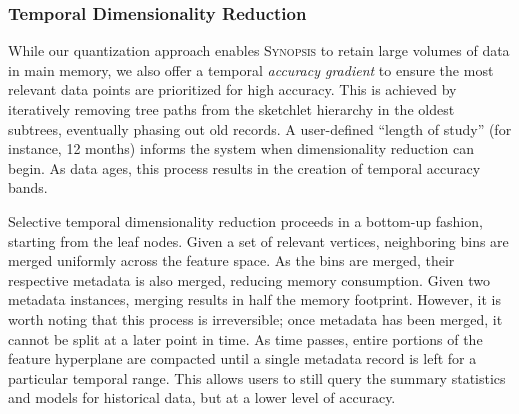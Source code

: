 \subsubsection{Temporal Dimensionality Reduction}
While our quantization approach enables \textsc{Synopsis} to retain large volumes of data in main memory, we also offer a temporal \emph{accuracy gradient} to ensure the most relevant data points are prioritized for high accuracy. This is achieved by iteratively removing tree paths from the sketchlet hierarchy in the oldest subtrees, eventually phasing out old records. A user-defined ``length of study'' (for instance, 12 months) informs the system when dimensionality reduction can begin. As data ages, this process results in the creation of temporal accuracy bands.

Selective temporal dimensionality reduction proceeds in a bottom-up fashion, starting from the leaf nodes. Given a set of relevant vertices, neighboring bins are merged uniformly across the feature space. As the bins are merged, their respective metadata is also merged, reducing memory consumption. Given two metadata instances, merging results in half the memory footprint. However, it is worth noting that this process is irreversible; once metadata has been merged, it cannot be split at a later point in time. As time passes, entire portions of the feature hyperplane are compacted until a single metadata record is left for a particular temporal range. This allows users to still query the summary statistics and models for historical data, but at a lower level of accuracy.
